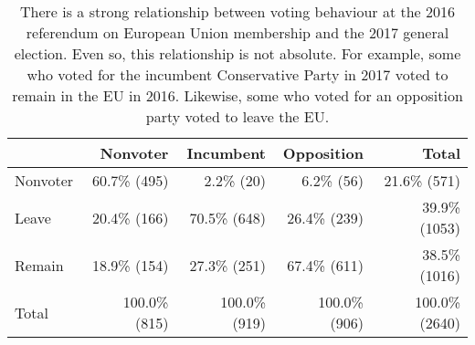 \begin{table}

\caption{\label{tab:tab1}There is a strong relationship between voting behaviour at the 2016 referendum on European Union membership and the 2017 general election. Even so, this relationship is not absolute. For example, some who voted for the incumbent Conservative Party in 2017 voted to remain in the EU in 2016. Likewise, some who voted for an opposition party voted to leave the EU.}
\centering
\begin{tabular}[t]{lrrrr}
\toprule
  & \textsf{Nonvoter} & \textsf{Incumbent} & \textsf{Opposition} & \textsf{Total}\\
\midrule
\textsf{Nonvoter} & 60.7\% (495) & 2.2\%  (20) & 6.2\%  (56) & 21.6\%  (571)\\
\textsf{Leave} & 20.4\% (166) & 70.5\% (648) & 26.4\% (239) & 39.9\% (1053)\\
\textsf{Remain} & 18.9\% (154) & 27.3\% (251) & 67.4\% (611) & 38.5\% (1016)\\
\textsf{Total} & 100.0\% (815) & 100.0\% (919) & 100.0\% (906) & 100.0\% (2640)\\
\bottomrule
\end{tabular}
\end{table}